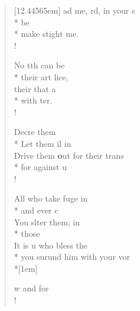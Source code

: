 \begin{flushleft}
\begin{verse}[12.44565em]
 ad me, rd, in your s\flagflex{\dag}\\*
be   \\*
make stight    me.\\!

 No tth can be    \\*
their art   lice,\\
their that a  \\*
with    ter.\\!

 Decre them   \\*
Let them il in  \\
Drive them \textbf{o}ut for their  trans\\*
for against u   \\!

 All who take fuge in    \\*
and ever c   \\
You slter them; in   \\*
those    \\
 It is u who bless the    \\*
you surund him with your vor   \\*[1em]

w and for  \\!
\end{verse}
\end{flushleft}
